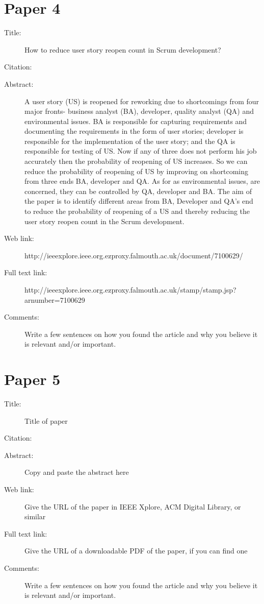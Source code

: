 \documentclass{scrartcl}
\begin{document}
\section*{Paper 4}
\begin{description}
\item[Title:] How to reduce user story reopen count in Scrum development?
\item[Citation:] \cite{bibtex_key}
\item[Abstract:] A user story (US) is reopened for reworking due to shortcomings from four major fronts- business analyst (BA), developer, quality analyst (QA) and environmental issues. BA is responsible for capturing requirements and documenting the requirements in the form of user stories; developer is responsible for the implementation of the user story; and the QA is responsible for testing of US. Now if any of three does not perform his job accurately then the probability of reopening of US increases. So we can reduce the probability of reopening of US by improving on shortcoming from three ends BA, developer and QA. As for as environmental issues, are concerned, they can be controlled by QA, developer and BA. The aim of the paper is to identify different areas from BA, Developer and QA's end to reduce the probability of reopening of a US and thereby reducing the user story reopen count in the Scrum development.
\item[Web link:] http://ieeexplore.ieee.org.ezproxy.falmouth.ac.uk/document/7100629/
\item[Full text link:] http://ieeexplore.ieee.org.ezproxy.falmouth.ac.uk/stamp/stamp.jsp?arnumber=7100629
\item[Comments:] Write a few sentences on how you found the article and why you believe it is relevant and/or important.
\end{description}

\section*{Paper 5}
\begin{description}
\item[Title:] Title of paper
\item[Citation:] \cite{bibtex_key}
\item[Abstract:] Copy and paste the abstract here
\item[Web link:] Give the URL of the paper in IEEE Xplore, ACM Digital Library, or similar
\item[Full text link:] Give the URL of a downloadable PDF of the paper, if you can find one
\item[Comments:] Write a few sentences on how you found the article and why you believe it is relevant and/or important.
\end{description}
\end{document}

